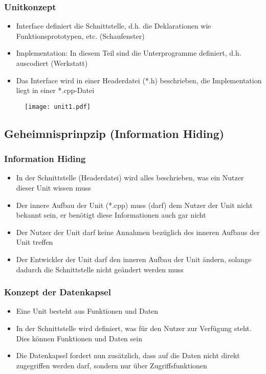 \subsubsection{Unitkonzept\hfill}
\label{sec:Unitkonzept}
\begin{itemize}
	\item Interface definiert die Schnittstelle, d.h. die Deklarationen wie Funktionsprototypen, etc. (Schaufenster)
	\item Implementation: In diesem Teil sind die Unterprogramme definiert, d.h. auscodiert (Werkstatt)
	\item Das Interface wird in einer Headerdatei (*.h) beschrieben, die Implementation liegt in einer *.cpp-Datei
\end{itemize}
\noindent
\begin{figure}[hh]
	\centering
	\texttt{[image: unit1.pdf]}
\end{figure}

\subsection{Geheimnisprinpzip (Information Hiding)\hfill}
\label{sec:Geheimnisprinzip (Information Hiding)}

\subsubsection{Information Hiding\hfill}
\label{sec:Information Hiding}
\begin{itemize}
	\item In der Schnittstelle (Headerdatei) wird alles beschrieben, was ein Nutzer dieser Unit wissen muss
	\item Der innere Aufbau der Unit (*.cpp) muss (darf) dem Nutzer der Unit nicht bekannt sein, er benötigt diese Informationen auch gar nicht
	\item Der Nutzer der Unit darf keine Annahmen bezüglich des inneren Aufbaus der Unit treffen
	\item Der Entwickler der Unit darf den inneren Aufbau der Unit ändern, solange dadurch die Schnittstelle nicht geändert werden muss
\end{itemize}

\subsubsection{Konzept der Datenkapsel\hfill}
\label{sec:Konzept der Datenkapsel}
\begin{itemize}
	\item Eine Unit besteht aus Funktionen und Daten
	\item In der Schnittstelle wird definiert, was für den Nutzer zur Verfügung steht. Dies können Funktionen und Daten sein
	\item Die Datenkapsel fordert nun zusätzlich, dass auf die Daten nicht direkt zugegriffen werden darf, sondern nur über Zugriffsfunktionen
\end{itemize}

